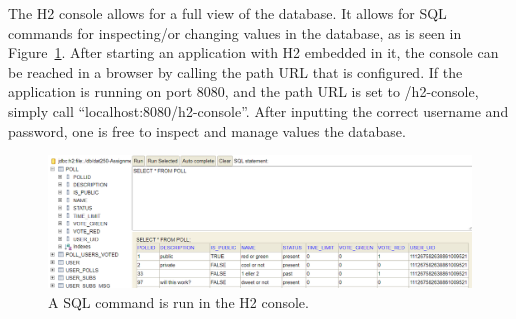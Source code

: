 The H2 console allows for a full view of the database. It allows for SQL commands for inspecting/or changing values in the database, as is seen in Figure~\ref{fig:h2console}. After starting an application with H2 embedded in it, the console can be reached in a browser by calling the path URL that is configured. If the application is running on port 8080, and the path URL is set to /h2-console, simply call “localhost:8080/h2-console”. After inputting the correct username and password, one is free to inspect and manage values the database. 
\begin{figure}[H]
  \centering
  \includegraphics[scale=0.45]{figs/h2cons.png}
  \caption[scale=0.5]{A SQL command is run in the H2 console.}
  \label{fig:h2console}
\end{figure}